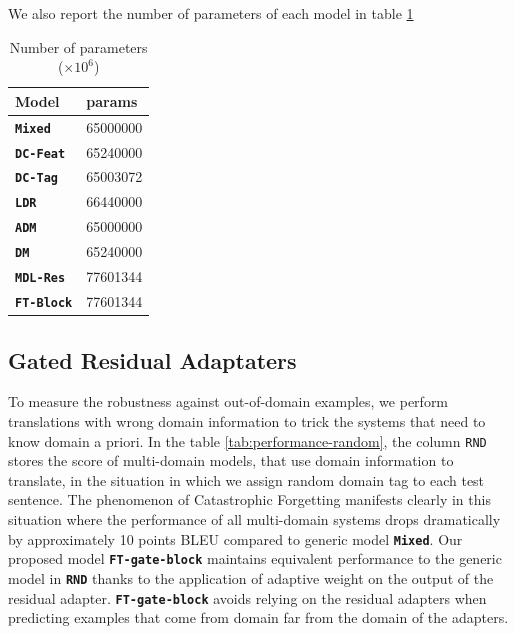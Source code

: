 \documentclass[11pt,a4paper]{article}
\newcommand{\domain}[1]{\texttt{\textsc{#1}}}
\newcommand{\system}[1]{\texttt{\textbf{#1}}}
\begin{document}
We also report the number of parameters of each model in table \ref{tab:params-multi}

\begin{table}[htbp]
  \centering
  \begin{tabular}{|l|l|} \hline
    Model & params \\ \hline 
    \system{Mixed}  & 65000000 \\
    \system{DC-Feat} & 65240000 \\
    \system{DC-Tag}  & 65003072 \\
    \system{LDR} & 66440000 \\
    \system{ADM}  & 65000000 \\
    \system{DM} & 65240000 \\
    \system{MDL-Res}  & 77601344 \\
    \system{FT-Block} & 77601344 \\
     \hline
  \end{tabular}
  \caption{Number of parameters ($\times 10^6$)}
  \label{tab:params-multi}
\end{table}

\subsection{Gated Residual Adaptaters \label{ssec:gate-exp}}
To measure the robustness against out-of-domain examples, we perform translations with wrong domain information to trick the systems that need to know domain a priori. In the table \ref{tab:performance-random}, the column \domain{RND} stores the score of multi-domain models, that use domain information to translate, in the situation in which we assign random domain tag to each test sentence. The phenomenon of Catastrophic Forgetting manifests clearly in this situation where the performance of all multi-domain systems drops dramatically by approximately 10 points BLEU compared to generic model \system{Mixed}. Our proposed model \system{FT-gate-block} maintains equivalent performance to the generic model in \system{RND} thanks to the application of adaptive weight on the output of the residual adapter. \system{FT-gate-block} avoids relying on the residual adapters when predicting examples that come from domain far from the domain of the adapters.
\end{document}
